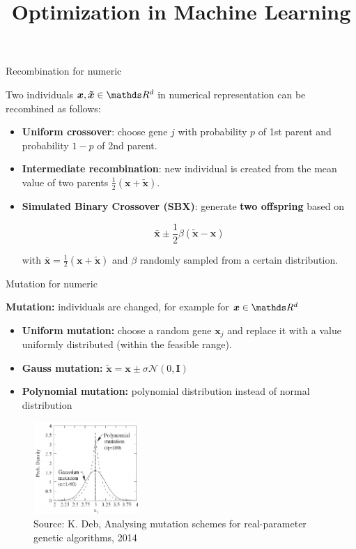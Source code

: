 \documentclass[11pt,compress,t,notes=noshow, xcolor=table]{beamer}
\title{Optimization in Machine Learning}
\date{}
\begin{document}
\sloppy

\begin{vbframe}{Recombination for numeric}

Two individuals $\bm{x}, \bm{\tilde x} \in \R^d$ in numerical representation can be recombined as follows:
\begin{itemize}
\item \textbf{Uniform crossover}: choose gene $j$ with probability $p$ of 1st parent and probability $1-p$ of 2nd parent.
\item \textbf{Intermediate recombination}: new individual is created from the mean value of two parents $\frac{1}{2}(\bm{x} + \bm{\tilde x})$.
\item \textbf{Simulated Binary Crossover (SBX)}: generate \textbf{two offspring} based on

$$
\bm{\bar x} \pm \frac{1}{2} \beta (\bm{\tilde x} - \bm{x})
$$

with $\bm{\bar x} = \frac{1}{2} (\bm{x} + \bm{\tilde x})$ and $\beta$ randomly sampled from a certain distribution.
\end{itemize}

\end{vbframe}

\begin{vbframe}{Mutation for numeric}

\footnotesize
\textbf{Mutation:} individuals are changed, for example for $\bm{x} \in \R^d$
\begin{itemize}
\item \textbf{Uniform mutation:} choose a random gene $\bm{x}_j$ and replace it with a value uniformly distributed (within the feasible range).
\item \textbf{Gauss mutation:} $\bm{\tilde{x}} = \bm{x} \pm \sigma \mathcal{N}(0, \boldsymbol{I})$
\item \textbf{Polynomial mutation:} polynomial distribution instead of normal distribution
\end{itemize}
\begin{center}
\begin{figure}
  \includegraphics[height = 3.5cm, width = 4cm]{figure_man/polynomial_mutation.png}\\
  \scriptsize{Source: K. Deb, Analysing mutation schemes for real-parameter genetic algorithms, 2014}
\end{figure}
\end{center}

\end{vbframe}
\end{document}
